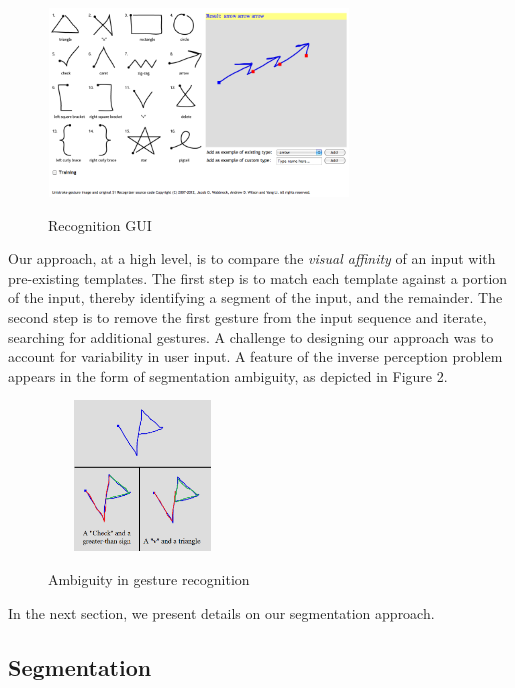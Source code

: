 \documentclass[twoside]{article}
\begin{document}
\begin{multicols}{2}
\begin{figure}[H]
	\centering
	\includegraphics[height=5cm, width=8cm]{Images/GUI.png}
	\label{fig1}
	\caption{Recognition GUI}
\end{figure}
  
Our approach, at a high level, is to compare the \emph{visual affinity} of an 
input with pre-existing templates. The first step
is to match each template against a portion of the input, thereby identifying a
segment of the input, and the remainder. The second step is to remove the first
gesture from the input sequence and iterate, searching for additional gestures.
A challenge to designing our approach was to account for variability in user
input. A feature of the inverse perception problem appears in the form
of segmentation ambiguity, as depicted in Figure 2.

\begin{figure}[H]
	\centering
	\includegraphics[height=4cm, width=5cm]{Images/Ambiguity1.png}
	\label{fig2}
	\caption{Ambiguity in gesture recognition}
\end{figure}

In the next section, we present details on our segmentation approach.

\subsection*{Segmentation}


\end{multicols}
\end{document}

